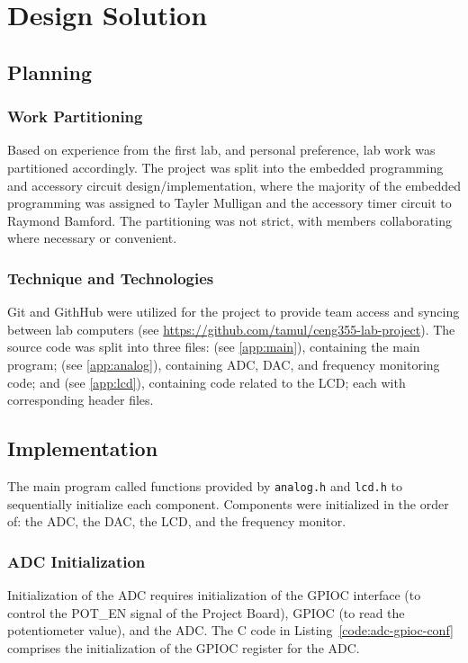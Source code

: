
\section{Design Solution}
\subsection{Planning}
\subsubsection{Work Partitioning}
Based on experience from the first lab, and personal preference, lab
work was partitioned accordingly. The project was split into the
embedded programming and accessory circuit design/implementation, where
the majority of the embedded programming was assigned to Tayler Mulligan
and the accessory timer circuit to Raymond Bamford. The partitioning was
not strict, with members collaborating where necessary or convenient.

\subsubsection{Technique and Technologies}
Git and GithHub were utilized for the project to provide team access and
syncing between lab computers (see
\url{https://github.com/tamul/ceng355-lab-project}). The source code was
split into three files:  (see \ref{app:main}), containing the main program;
 (see \ref{app:analog}), containing ADC, DAC, and frequency monitoring
code; and  (see \ref{app:lcd}), containing code related to the LCD; each
with corresponding header files.

\subsection{Implementation}
The main program called functions provided by \lstinline{analog.h} and
\lstinline{lcd.h} to sequentially initialize each component. Components
were initialized in the order of: the ADC, the DAC, the LCD, and the
frequency monitor. 

\subsubsection{ADC Initialization}
Initialization of the ADC requires initialization of the GPIOC interface
(to control the POT\_EN signal of the Project Board), GPIOC (to read the
 potentiometer value), and the ADC. The C code in
 Listing~\ref{code:adc-gpioc-conf} comprises the initialization of the
 GPIOC register for the ADC.


